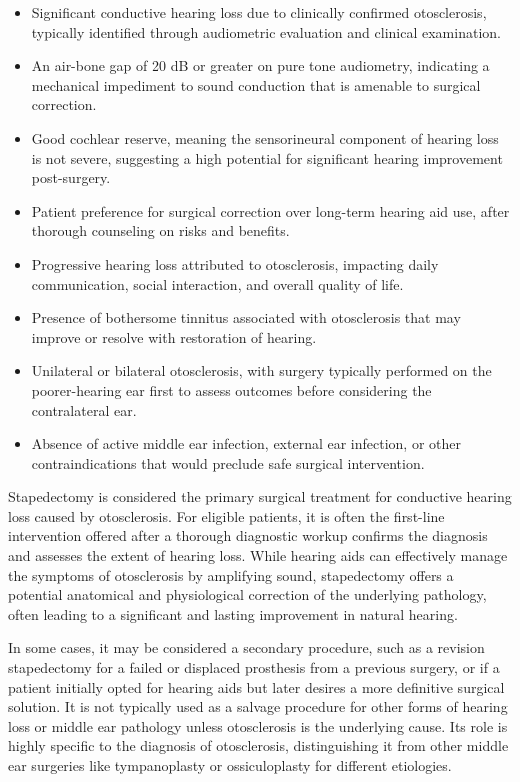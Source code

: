 \begin{itemize}
  \item Significant conductive hearing loss due to clinically confirmed otosclerosis, typically identified through audiometric evaluation and clinical examination.
  \item An air-bone gap of 20 dB or greater on pure tone audiometry, indicating a mechanical impediment to sound conduction that is amenable to surgical correction.
  \item Good cochlear reserve, meaning the sensorineural component of hearing loss is not severe, suggesting a high potential for significant hearing improvement post-surgery.
  \item Patient preference for surgical correction over long-term hearing aid use, after thorough counseling on risks and benefits.
  \item Progressive hearing loss attributed to otosclerosis, impacting daily communication, social interaction, and overall quality of life.
  \item Presence of bothersome tinnitus associated with otosclerosis that may improve or resolve with restoration of hearing.
  \item Unilateral or bilateral otosclerosis, with surgery typically performed on the poorer-hearing ear first to assess outcomes before considering the contralateral ear.
  \item Absence of active middle ear infection, external ear infection, or other contraindications that would preclude safe surgical intervention.
\end{itemize}

Stapedectomy is considered the primary surgical treatment for conductive hearing loss caused by otosclerosis. For eligible patients, it is often the first-line intervention offered after a thorough diagnostic workup confirms the diagnosis and assesses the extent of hearing loss. While hearing aids can effectively manage the symptoms of otosclerosis by amplifying sound, stapedectomy offers a potential anatomical and physiological correction of the underlying pathology, often leading to a significant and lasting improvement in natural hearing.

In some cases, it may be considered a secondary procedure, such as a revision stapedectomy for a failed or displaced prosthesis from a previous surgery, or if a patient initially opted for hearing aids but later desires a more definitive surgical solution. It is not typically used as a salvage procedure for other forms of hearing loss or middle ear pathology unless otosclerosis is the underlying cause. Its role is highly specific to the diagnosis of otosclerosis, distinguishing it from other middle ear surgeries like tympanoplasty or ossiculoplasty for different etiologies.

